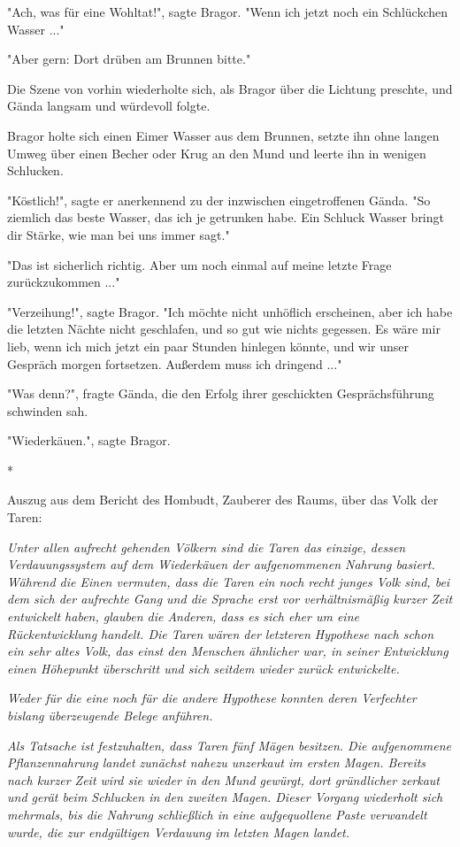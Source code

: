 \documentclass[10pt, a4paper, oneside]{book}
\begin{document}
\begin{multicols}{2}
"Ach, was für eine Wohltat!", sagte Bragor. "Wenn ich jetzt noch ein Schlückchen Wasser ..." 

"Aber gern: Dort drüben am Brunnen bitte." 

Die Szene von vorhin wiederholte sich, als Bragor über die Lichtung preschte, und Gända langsam und würdevoll folgte. 

Bragor holte sich einen Eimer Wasser aus dem Brunnen, setzte ihn ohne langen Umweg über einen Becher oder Krug an den Mund und leerte ihn in wenigen Schlucken. 

"Köstlich!", sagte er anerkennend zu der inzwischen eingetroffenen Gända. "So ziemlich das beste Wasser, das ich je getrunken habe. Ein Schluck Wasser bringt dir Stärke, wie man bei uns immer sagt." 

"Das ist sicherlich richtig. Aber um noch einmal auf meine letzte Frage zurückzukommen ..." 

"Verzeihung!", sagte Bragor. "Ich möchte nicht unhöflich erscheinen, aber ich habe die letzten Nächte nicht geschlafen, und so gut wie nichts gegessen. Es wäre mir lieb, wenn ich mich jetzt ein paar Stunden hinlegen könnte, und wir unser Gespräch morgen fortsetzen. Außerdem muss ich dringend ..." 

"Was denn?", fragte Gända, die den Erfolg ihrer geschickten Gesprächsführung schwinden sah. 

"Wiederkäuen.", sagte Bragor. 

\begin{center}
    *
\end{center}

Auszug aus dem Bericht des Hombudt, Zauberer des Raums, über das Volk der 
Taren: 

\textit{Unter allen aufrecht gehenden Völkern sind die Taren das einzige, dessen Verdauungssystem auf dem Wiederkäuen der aufgenommenen Nahrung basiert. Während die Einen vermuten, dass die Taren ein noch recht junges Volk sind, bei dem sich der aufrechte Gang und die Sprache erst vor verhältnismäßig kurzer Zeit entwickelt haben, glauben die Anderen, dass es sich eher um eine Rückentwicklung handelt. Die Taren wären der letzteren Hypothese nach schon ein sehr altes Volk, das einst den Menschen ähnlicher war, in seiner Entwicklung einen Höhepunkt überschritt und sich seitdem wieder zurück entwickelte. }

\textit{Weder für die eine noch für die andere Hypothese konnten deren Verfechter bislang überzeugende Belege anführen.}

\textit{Als Tatsache ist festzuhalten, dass Taren fünf Mägen besitzen. Die aufgenommene Pflanzennahrung landet zunächst nahezu unzerkaut im ersten Magen. Bereits nach kurzer Zeit wird sie wieder in den Mund gewürgt, dort gründlicher zerkaut und gerät beim Schlucken in den zweiten Magen. Dieser Vorgang wiederholt sich mehrmals, bis die Nahrung schließlich in eine aufgequollene Paste verwandelt wurde, die zur endgültigen Verdauung im letzten Magen landet.}


\end{multicols}
\end{document}
